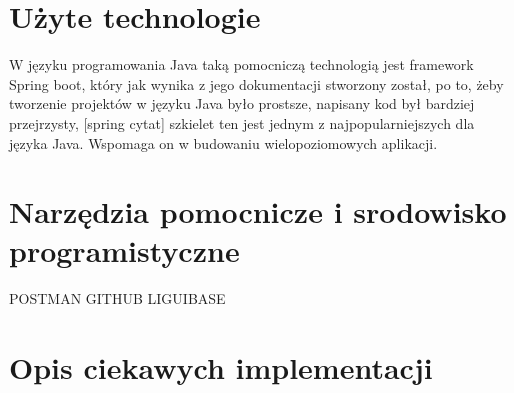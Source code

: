 \section{Użyte technologie}
W języku programowania Java taką pomocniczą technologią jest framework Spring boot, który  jak wynika z jego dokumentacji stworzony został, po to, żeby tworzenie projektów w języku Java było prostsze, napisany kod był bardziej przejrzysty, [spring cytat]  szkielet ten jest jednym z najpopularniejszych dla języka Java. Wspomaga on w budowaniu wielopoziomowych aplikacji. 
\section{Narzędzia pomocnicze i srodowisko programistyczne }
POSTMAN
GITHUB
LIGUIBASE
	
\section{Opis ciekawych implementacji}
